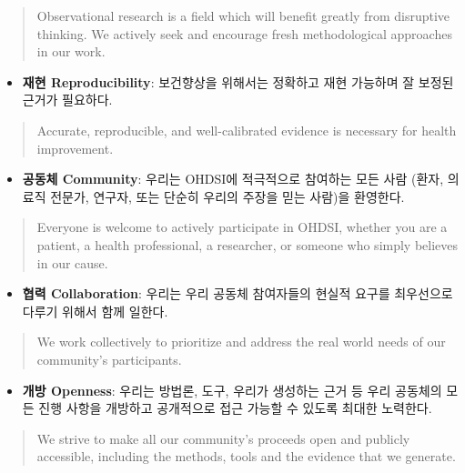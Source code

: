 \documentclass[10.5pt]{book}
\providecommand{\tightlist}{%
  \setlength{\itemsep}{0pt}\setlength{\parskip}{0pt}}
\theoremstyle{definition}
\theoremstyle{definition}
\theoremstyle{definition}
\theoremstyle{remark}
\begin{document}
\begin{quote}
Observational research is a field which will benefit greatly from
disruptive thinking. We actively seek and encourage fresh methodological
approaches in our work.
\end{quote}

\begin{itemize}
\tightlist
\item
  \textbf{재현 Reproducibility}: 보건향상을 위해서는 정확하고 재현
  가능하며 잘 보정된 근거가 필요하다.
\end{itemize}

\begin{quote}
Accurate, reproducible, and well-calibrated evidence is necessary for
health improvement.
\end{quote}

\begin{itemize}
\tightlist
\item
  \textbf{공동체 Community}: 우리는 OHDSI에 적극적으로 참여하는 모든
  사람 (환자, 의료직 전문가, 연구자, 또는 단순히 우리의 주장을 믿는
  사람)을 환영한다.
\end{itemize}

\begin{quote}
Everyone is welcome to actively participate in OHDSI, whether you are a
patient, a health professional, a researcher, or someone who simply
believes in our cause.
\end{quote}

\begin{itemize}
\tightlist
\item
  \textbf{협력 Collaboration}: 우리는 우리 공동체 참여자들의 현실적
  요구를 최우선으로 다루기 위해서 함께 일한다.
\end{itemize}

\begin{quote}
We work collectively to prioritize and address the real world needs of
our community's participants.
\end{quote}

\begin{itemize}
\tightlist
\item
  \textbf{개방 Openness}: 우리는 방법론, 도구, 우리가 생성하는 근거 등
  우리 공동체의 모든 진행 사항을 개방하고 공개적으로 접근 가능할 수
  있도록 최대한 노력한다.
\end{itemize}

\begin{quote}
We strive to make all our community's proceeds open and publicly
accessible, including the methods, tools and the evidence that we
generate.
\end{quote}
\end{document}
